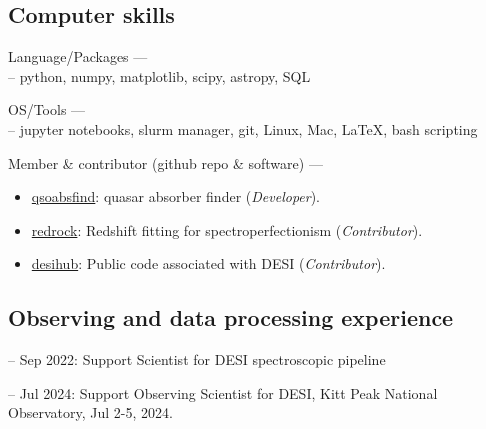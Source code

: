 \documentclass[12pt,letterpaper]{article}
\begin{document}
\subsection{Computer skills}
\begin{list}{}{\cvlist}
\item Language/Packages ---\\
    -- python, numpy, matplotlib, scipy, astropy, SQL
\item OS/Tools --- \\
    -- jupyter notebooks, slurm manager, git, Linux, Mac, \LaTeX, bash scripting
\item Member \& contributor (github repo \& software) ---
    \begin{itemize}
        \item[] \href{https://github.com/abhi0395/qsoabsfind}{qsoabsfind}:  quasar absorber finder (\textit{Developer}).
      \item[] \href{https://github.com/desihub/redrock}{redrock}: Redshift fitting for spectroperfectionism (\textit{Contributor}).
      \item[] \href{https://github.com/desihub}{desihub}: Public code associated with DESI (\textit{Contributor}).
  \end{itemize}
\end{list}


\subsection{Observing and data processing experience}
\begin{list}{}{\cvlist}
\item -- Sep 2022: Support Scientist for DESI spectroscopic pipeline
\item -- Jul 2024: Support Observing Scientist for DESI, Kitt Peak National Observatory, Jul 2-5, 2024.
\end{list}
\end{document}
